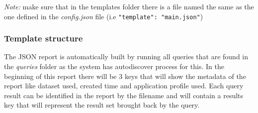 \textit{Note:} make sure that in the templates folder there is a file named the same as the one defined in the \textit{config.json} file (i.e \texttt{"template": "main.json"})

\subsubsection{Template structure}
The JSON report is automatically built by running all queries that are found in the \textit{queries} folder as the system has autodiscover process for this. In the beginning of this report there will be 3 keys that will show the metadata of the report like dataset used, created time and application profile used. Each query result can be identified in the report by the filename and will contain a results key that will represent the result set brought back by the query.
